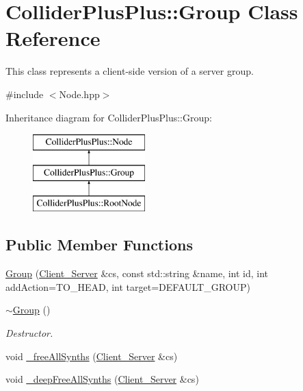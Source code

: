 \hypertarget{classColliderPlusPlus_1_1Group}{\section{Collider\-Plus\-Plus\-:\-:Group Class Reference}
\label{classColliderPlusPlus_1_1Group}
}


This class represents a client-\/side version of a server group.  




{\ttfamily \#include $<$Node.\-hpp$>$}

Inheritance diagram for Collider\-Plus\-Plus\-:\-:Group\-:\begin{figure}[H]
\begin{center}
\leavevmode
\includegraphics[height=3.000000cm]{classColliderPlusPlus_1_1Group}
\end{center}
\end{figure}
\subsection*{Public Member Functions}
\begin{DoxyCompactItemize}
\item 
\hyperlink{classColliderPlusPlus_1_1Group_aaacdebb53fcb4acabc16d4d7f780364a}{Group} (\hyperlink{classColliderPlusPlus_1_1Client__Server}{Client\-\_\-\-Server} \&cs, const std\-::string \&name, int id, int add\-Action=T\-O\-\_\-\-H\-E\-A\-D, int target=D\-E\-F\-A\-U\-L\-T\-\_\-\-G\-R\-O\-U\-P)
\item 
\hypertarget{classColliderPlusPlus_1_1Group_aa7f0bbd9db8735ee8dc5fdfc8c7239cf}{\hyperlink{classColliderPlusPlus_1_1Group_aa7f0bbd9db8735ee8dc5fdfc8c7239cf}{$\sim$\-Group} ()}\label{classColliderPlusPlus_1_1Group_aa7f0bbd9db8735ee8dc5fdfc8c7239cf}

\begin{DoxyCompactList}\small\item\em Destructor. \end{DoxyCompactList}\item 
void \hyperlink{classColliderPlusPlus_1_1Group_aff4f20b6099abba697333e079e7bbeb3}{\-\_\-free\-All\-Synths} (\hyperlink{classColliderPlusPlus_1_1Client__Server}{Client\-\_\-\-Server} \&cs)
\item 
void \hyperlink{classColliderPlusPlus_1_1Group_a843a985ffb36764b5e568560a2ea9608}{\-\_\-deep\-Free\-All\-Synths} (\hyperlink{classColliderPlusPlus_1_1Client__Server}{Client\-\_\-\-Server} \&cs)
\end{DoxyCompactItemize}
